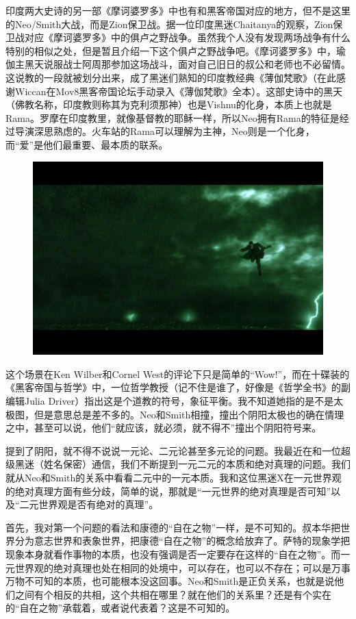 \documentclass[UTF8]{ctexart}
\begin{document}
印度两大史诗的另一部《摩诃婆罗多》中也有和黑客帝国对应的地方，但不是这里的Neo/Smith大战，而是Zion保卫战。据一位印度黑迷Chaitanya的观察，Zion保卫战对应《摩诃婆罗多》中的俱卢之野战争。虽然我个人没有发现两场战争有什么特别的相似之处，但是暂且介绍一下这个俱卢之野战争吧。《摩诃婆罗多》中，瑜伽主黑天说服战士阿周那参加这场战斗，面对自己旧日的叔公和老师也不必留情。这说教的一段就被划分出来，成了黑迷们熟知的印度教经典《薄伽梵歌》（在此感谢Wiccan在Mov8黑客帝国论坛手动录入《薄伽梵歌》全本）。这部史诗中的黑天（佛教名称，印度教则称其为克利须那神）也是Vishnu的化身，本质上也就是Rama。罗摩在印度教里，就像基督教的耶稣一样，所以Neo拥有Rama的特征是经过导演深思熟虑的。火车站的Rama可以理解为主神，Neo则是一个化身，而“爱”是他们最重要、最本质的联系。

\begin{figure}[htb]
\centering
\includegraphics[width=0.5\linewidth]{fig/1eb6b21ca7c4c68886d6b64f.jpg}
\end{figure}

这个场景在Ken Wilber和Cornel West的评论下只是简单的“Wow!”，而在十碟装的《黑客帝国与哲学》中，一位哲学教授（记不住是谁了，好像是《哲学全书》的副编辑Julia Driver）指出这是个道教的符号，象征平衡。我不知道她指的是不是太极图，但是意思总是差不多的。Neo和Smith相撞，撞出个阴阳太极也的确在情理之中，甚至可以说，他们“就应该，就必须，就不得不”撞出个阴阳符号来。

提到了阴阳，就不得不说说一元论、二元论甚至多元论的问题。我最近在和一位超级黑迷（姓名保密）通信，我们不断提到一元二元的本质和绝对真理的问题。我们就从Neo和Smith的关系中看看二元中的一元本质。我和这位黑迷X在一元世界观的绝对真理方面有些分歧，简单的说，那就是“一元世界的绝对真理是否可知”以及“二元世界观是否有绝对的真理”。

首先，我对第一个问题的看法和康德的“自在之物”一样，是不可知的。叔本华把世界分为意志世界和表象世界，把康德“自在之物”的概念给放弃了。萨特的现象学把现象本身就看作事物的本质，也没有强调是否一定要存在这样的“自在之物”。而一元世界观的绝对真理也处在相同的处境中，可以存在，也可以不存在；可以是万事万物不可知的本质，也可能根本没这回事。Neo和Smith是正负关系，也就是说他们之间有个相反的共相，这个共相在哪里？就在他们的关系里？还是有个实在的“自在之物”承载着，或者说代表着？这是不可知的。
\end{document}
